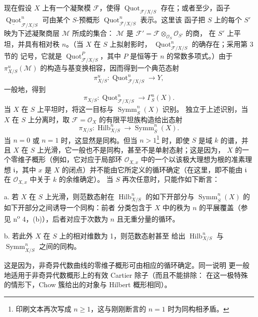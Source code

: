 现在假设 $X$ 上有一个凝聚模 $\mathcal F$，使得
$\operatorname{Quot}_{\mathcal F/X/S}$ 存在；或者至少，函子
$\underline{\operatorname{Quot}}^n_{\mathcal F/X/S}$ 可由某个
$S$-预概形 $\operatorname{Quot}^n_{\mathcal F/X/S}$ 表示。这里该
函子把 $S$ 上的每个 $S'$ 映为下述凝聚商层 $\mathcal M$ 所成的集合：
$\mathcal M$ 是
$\mathcal F'=\mathcal F\otimes_{\mathcal O_S}\mathcal O_{S'}$ 的商，
在 $S'$ 上平坦，并具有相对秩 $n$。（当 $X$ 在 $S$ 上拟射影时，
$\operatorname{Quot}^n_{\mathcal F/X/S}$ 的确存在；采用第 3 节的
记号，它就是 $\operatorname{Quot}^P_{\mathcal F/X/S}$，其中 $P$
是恒等于 $n$ 的常数多项式。）由于
$\pi^u_{X/S}(\mathcal M)$ 的构造与基变换相容，因而得到一个典范态射
\[
\pi^u_{X/S}:\operatorname{Quot}^n_{\mathcal F/X/S}\longrightarrow Y,
\]
一般地，得到
\[
\pi_{X/S}:\operatorname{Quot}^n_{\mathcal F/X/S}
\longrightarrow\Gamma^n_S(X).
\]
当 $X$ 在 $S$ 上平坦时，将这一目标与 $\operatorname{Symm}^n_S(X)$ 识别。
独立于上述识别，当 $X$ 在 $S$ 上分离时，取 $\mathcal F=\mathcal O_X$ 的有限平坦族构造给出态射
\[
\pi_{X/S}:\operatorname{Hilb}^n_{X/S}
\longrightarrow\operatorname{Symm}^n_S(X).
\]
当 $n=0$ 或 $n=1$ 时，这显然是同构。但当
$n>1$\footnote{印刷文本再次写成 $n\geq1$，这与刚刚断言的
$n=1$ 时为同构相矛盾。} 时，即使 $S$ 是域 $k$ 的谱，并且 $X$
在 $S$ 上光滑，它一般也不是同构，甚至不是单射态射；这是因为，
$X$ 的一个零维子概形（例如，它对应于局部环 $\mathcal O_{X,x}$
中的一个以该极大理想为根的准素理想 $\mathfrak i$，其中 $x$ 是 $X$
的闭点）并不能由它所定义的循环确定（在这里，即不能由
$\mathfrak i$ 在 $\mathcal O_{X,x}$ 中关于 $k$ 的余维确定）。
当 $S$ 再次任意时，只能作如下断言：

\medskip
\noindent a. 若 $X$ 在 $S$ 上光滑，则范数态射在
$\operatorname{Hilb}^n_{X/S}$ 的如下开部分与
$\operatorname{Symm}^n_S(X)$ 的如下开部分之间诱导一个同构：前者
分类包含于 $X$ 中的秩为 $n$ 的平展覆盖（参见
n\textsuperscript{o} 4，(b)），后者对应于次数为 $n$ 且无重分量的循环。

\medskip
\noindent b. 若此外 $X$ 在 $S$ 上的相对维数为 1，则范数态射甚至
给出
$\operatorname{Hilb}^n_{X/S}$ 与 $\operatorname{Symm}^n_{X/S}$
之间的同构。

这是因为，非奇异代数曲线的零维子概形可由相应的循环确定。同一说明
更一般地适用于非奇异代数概形上的有效 Cartier 除子（而且不能排除：
在这一极特殊的情形下，Chow 簇给出的对象与 Hilbert 概形相同）。


